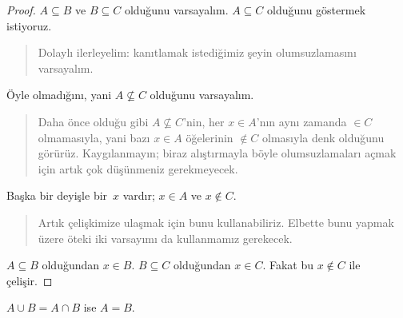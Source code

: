 \documentclass[../../../include/open-logic-section]{subfiles}
\begin{document}
\begin{proof}
  $A \subseteq B$ ve $B \subseteq C$ olduğunu varsayalım. $A
  \subseteq C$ olduğunu göstermek istiyoruz.
  \begin{quote}
    Dolaylı ilerleyelim: kanıtlamak istediğimiz şeyin olumsuzlamasını
    varsayalım.
  \end{quote}
  Öyle olmadığını, yani $A \nsubseteq C$ olduğunu varsayalım.
  \begin{quote}
    Daha önce olduğu gibi $A \nsubseteq C$'nin, her $x \in A$'nın aynı
    zamanda $\in C$ olmamasıyla, yani bazı $x \in A$ öğelerinin $\notin C$
    olmasıyla denk olduğunu görürüz. Kaygılanmayın; biraz alıştırmayla
    böyle olumsuzlamaları açmak için artık çok düşünmeniz gerekmeyecek.
  \end{quote}
  Başka bir deyişle bir~$x$ vardır; $x \in A$ ve $x \notin C$.
  \begin{quote}
    Artık çelişkimize ulaşmak için bunu kullanabiliriz. Elbette bunu
    yapmak üzere öteki iki varsayımı da kullanmamız gerekecek.
  \end{quote}
  $A \subseteq B$ olduğundan $x \in B$. $B \subseteq C$ olduğundan $x
  \in C$. Fakat bu $x \notin C$ ile çelişir.
\end{proof}

\begin{prop}
$A \cup B = A \cap B$ ise $A = B$.
\end{prop}
\end{document}
